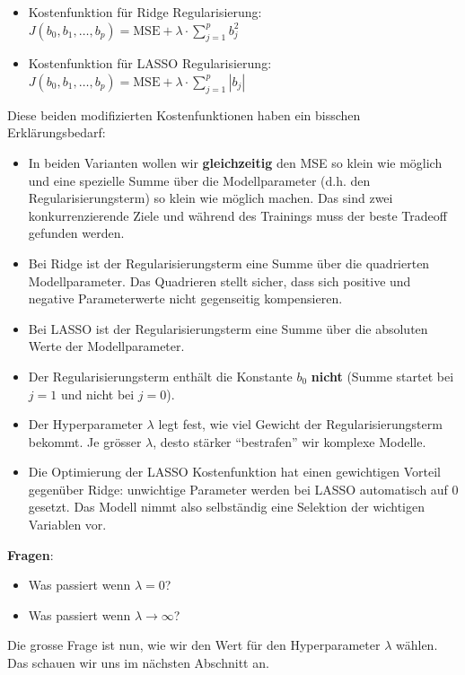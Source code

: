 \documentclass[
]{book}
\providecommand{\tightlist}{%
  \setlength{\itemsep}{0pt}\setlength{\parskip}{0pt}}
\begin{document}
\begin{itemize}
\tightlist
\item
  Kostenfunktion für Ridge Regularisierung: \(J(b_0,b_1,\dots,b_p) = \text{MSE} + \lambda \cdot \sum_{j=1}^p b_j^2\)
\item
  Kostenfunktion für LASSO Regularisierung: \(J(b_0,b_1,\dots,b_p) = \text{MSE} + \lambda \cdot \sum_{j=1}^p |b_j|\)
\end{itemize}

Diese beiden modifizierten Kostenfunktionen haben ein bisschen Erklärungsbedarf:

\begin{itemize}
\tightlist
\item
  In beiden Varianten wollen wir \textbf{gleichzeitig} den MSE so klein wie möglich und eine spezielle Summe über die Modellparameter (d.h. den Regularisierungsterm) so klein wie möglich machen. Das sind zwei konkurrenzierende Ziele und während des Trainings muss der beste Tradeoff gefunden werden.
\item
  Bei Ridge ist der Regularisierungsterm eine Summe über die quadrierten Modellparameter. Das Quadrieren stellt sicher, dass sich positive und negative Parameterwerte nicht gegenseitig kompensieren.
\item
  Bei LASSO ist der Regularisierungsterm eine Summe über die absoluten Werte der Modellparameter.
\item
  Der Regularisierungsterm enthält die Konstante \(b_0\) \textbf{nicht} (Summe startet bei \(j=1\) und nicht bei \(j=0\)).
\item
  Der Hyperparameter \(\lambda\) legt fest, wie viel Gewicht der Regularisierungsterm bekommt. Je grösser \(\lambda\), desto stärker ``bestrafen'' wir komplexe Modelle.
\item
  Die Optimierung der LASSO Kostenfunktion hat einen gewichtigen Vorteil gegenüber Ridge: unwichtige Parameter werden bei LASSO automatisch auf 0 gesetzt. Das Modell nimmt also selbständig eine Selektion der wichtigen Variablen vor.
\end{itemize}

\textbf{Fragen}:

\begin{itemize}
\tightlist
\item
  Was passiert wenn \(\lambda=0\)?
\item
  Was passiert wenn \(\lambda \rightarrow \infty\)?
\end{itemize}

Die grosse Frage ist nun, wie wir den Wert für den Hyperparameter \(\lambda\) wählen. Das schauen wir uns im nächsten Abschnitt an.
\end{document}
